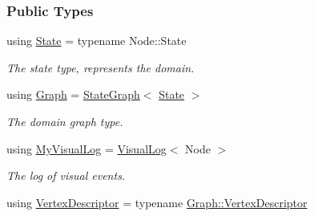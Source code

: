 \subsubsection*{Public Types}
\begin{DoxyCompactItemize}
\item 
using \hyperlink{structslb_1_1core_1_1ui_1_1Drawer_adf9110c216aa1d0a5080547a3bc22f06}{State} = typename Node\+::\+State\hypertarget{structslb_1_1core_1_1ui_1_1Drawer_adf9110c216aa1d0a5080547a3bc22f06}{}\label{structslb_1_1core_1_1ui_1_1Drawer_adf9110c216aa1d0a5080547a3bc22f06}

\begin{DoxyCompactList}\small\item\em The state type, represents the domain. \end{DoxyCompactList}\item 
using \hyperlink{structslb_1_1core_1_1ui_1_1Drawer_a70000b142df2f4e01123aa4bed5fd3a2}{Graph} = \hyperlink{structslb_1_1core_1_1ui_1_1StateGraph}{State\+Graph}$<$ \hyperlink{structslb_1_1core_1_1ui_1_1Drawer_adf9110c216aa1d0a5080547a3bc22f06}{State} $>$\hypertarget{structslb_1_1core_1_1ui_1_1Drawer_a70000b142df2f4e01123aa4bed5fd3a2}{}\label{structslb_1_1core_1_1ui_1_1Drawer_a70000b142df2f4e01123aa4bed5fd3a2}

\begin{DoxyCompactList}\small\item\em The domain graph type. \end{DoxyCompactList}\item 
using \hyperlink{structslb_1_1core_1_1ui_1_1Drawer_a1e0ed3482642e5d13e234f83bf690b8a}{My\+Visual\+Log} = \hyperlink{structslb_1_1core_1_1ui_1_1VisualLog}{Visual\+Log}$<$ Node $>$\hypertarget{structslb_1_1core_1_1ui_1_1Drawer_a1e0ed3482642e5d13e234f83bf690b8a}{}\label{structslb_1_1core_1_1ui_1_1Drawer_a1e0ed3482642e5d13e234f83bf690b8a}

\begin{DoxyCompactList}\small\item\em The log of visual events. \end{DoxyCompactList}\item 
using \hyperlink{structslb_1_1core_1_1ui_1_1Drawer_a3106bd6b1354ea4a24c3ef169c1e18b8}{Vertex\+Descriptor} = typename \hyperlink{structslb_1_1core_1_1ui_1_1StateGraph_ab2d88fce7d30dc6346910900212a7e6d}{Graph\+::\+Vertex\+Descriptor}\hypertarget{structslb_1_1core_1_1ui_1_1Drawer_a3106bd6b1354ea4a24c3ef169c1e18b8}{}\label{structslb_1_1core_1_1ui_1_1Drawer_a3106bd6b1354ea4a24c3ef169c1e18b8}


\end{DoxyCompactItemize}
